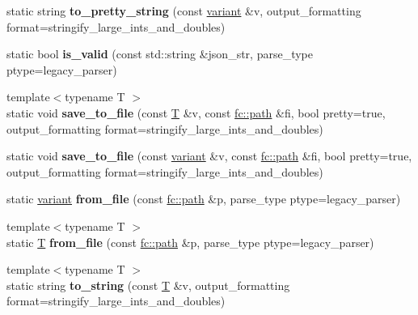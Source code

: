 \begin{DoxyCompactItemize}
\item 
\mbox{\label{classfc_1_1json_a7a25d70146c0f0edad4171fc19b8964c}} 
static string {\bfseries to\+\_\+pretty\+\_\+string} (const \mbox{\hyperlink{classfc_1_1variant}{variant}} \&v, output\+\_\+formatting format=stringify\+\_\+large\+\_\+ints\+\_\+and\+\_\+doubles)
\item 
\mbox{\label{classfc_1_1json_a5960eb598e76bf89b2ebef163ed2920a}} 
static bool {\bfseries is\+\_\+valid} (const std\+::string \&json\+\_\+str, parse\+\_\+type ptype=legacy\+\_\+parser)
\item 
\mbox{\label{classfc_1_1json_afcee2fd2c439adb9434ba1c9c9c64f2a}} 
{\footnotesize template$<$typename T $>$ }\\static void {\bfseries save\+\_\+to\+\_\+file} (const \mbox{\hyperlink{struct_t}{T}} \&v, const \mbox{\hyperlink{classfc_1_1path}{fc\+::path}} \&fi, bool pretty=true, output\+\_\+formatting format=stringify\+\_\+large\+\_\+ints\+\_\+and\+\_\+doubles)
\item 
\mbox{\label{classfc_1_1json_a0ea67bfff912ff1ecb2f1ffe3666fd3d}} 
static void {\bfseries save\+\_\+to\+\_\+file} (const \mbox{\hyperlink{classfc_1_1variant}{variant}} \&v, const \mbox{\hyperlink{classfc_1_1path}{fc\+::path}} \&fi, bool pretty=true, output\+\_\+formatting format=stringify\+\_\+large\+\_\+ints\+\_\+and\+\_\+doubles)
\item 
\mbox{\label{classfc_1_1json_a854731f3eea8b04d279e18a5f7f837c0}} 
static \mbox{\hyperlink{classfc_1_1variant}{variant}} {\bfseries from\+\_\+file} (const \mbox{\hyperlink{classfc_1_1path}{fc\+::path}} \&p, parse\+\_\+type ptype=legacy\+\_\+parser)
\item 
\mbox{\label{classfc_1_1json_ae08055e237b498627945d28003a48619}} 
{\footnotesize template$<$typename T $>$ }\\static \mbox{\hyperlink{struct_t}{T}} {\bfseries from\+\_\+file} (const \mbox{\hyperlink{classfc_1_1path}{fc\+::path}} \&p, parse\+\_\+type ptype=legacy\+\_\+parser)
\item 
\mbox{\label{classfc_1_1json_a8d663f952ce9578b85083adbdf78966a}} 
{\footnotesize template$<$typename T $>$ }\\static string {\bfseries to\+\_\+string} (const \mbox{\hyperlink{struct_t}{T}} \&v, output\+\_\+formatting format=stringify\+\_\+large\+\_\+ints\+\_\+and\+\_\+doubles)

\end{DoxyCompactItemize}
